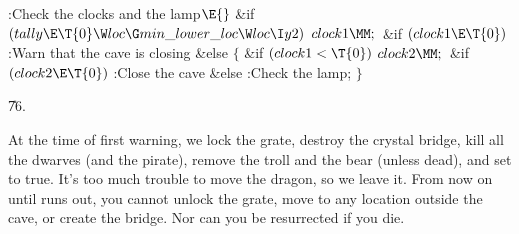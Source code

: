 \Y\B\4:Check the clocks and the lamp\X${}\E{}$\6
\&{if} ${}(\\{tally}\E\T{0}\W\\{loc}\G\\{min\_lower\_loc}\W\\{loc}\I\\{y2}){}$%
\1\5
${}\\{clock1}\MM;{}$\2\6
\&{if} ${}(\\{clock1}\E\T{0}){}$\1\5
:Warn that the cave is closing\X\2\6
\&{else}\5
${}\{{}$\1\6
\&{if} ${}(\\{clock1}<\T{0}){}$\1\5
${}\\{clock2}\MM;{}$\2\6
\&{if} ${}(\\{clock2}\E\T{0}){}$\1\5
:Close the cave\X\2\6
\&{else}\1\5
:Check the lamp\X;\2\6
\4${}\}{}$\2\par
\U76.\fi

At the time of first warning, we lock the grate, destroy
the crystal bridge,
kill all the dwarves (and the pirate), remove the troll and the bear
(unless dead), and set  to true. It's too much trouble to move
the dragon, so we leave it. From now on until  runs out, you
cannot unlock the grate, move to any location outside the cave, or
create the bridge. Nor can you be resurrected if you die.

